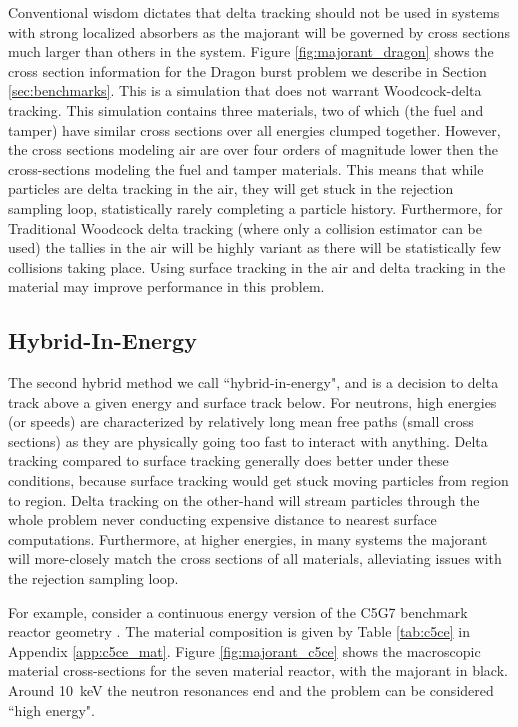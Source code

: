 Conventional wisdom dictates that delta tracking should not be used in systems with strong localized absorbers as the majorant will be governed by cross sections much larger than others in the system.
Figure \ref{fig:majorant_dragon} shows the cross section information for the Dragon burst problem we describe in Section \ref{sec:benchmarks}.
This is a simulation that does not warrant Woodcock-delta tracking.
This simulation contains three materials, two of which (the fuel and tamper) have similar cross sections over all energies clumped together.
However, the cross sections modeling air are over four orders of magnitude lower then the cross-sections modeling the fuel and tamper materials.
This means that while particles are delta tracking in the air, they will get stuck in the rejection sampling loop, statistically rarely completing a particle history.
Furthermore, for Traditional Woodcock delta tracking (where only a collision estimator can be used) the tallies in the air will be highly variant as there will be statistically few collisions taking place.
Using surface tracking in the air and delta tracking in the material may improve performance in this problem.

\subsection{Hybrid-In-Energy}
\label{sec:cutoff}

The second hybrid method we call ``hybrid-in-energy", and is a decision to delta track above a given energy and surface track below.
For neutrons, high energies (or speeds) are characterized by relatively long mean free paths (small cross sections) as they are physically going too fast to interact with anything.
Delta tracking compared to surface tracking generally does better under these conditions, because surface tracking would get stuck moving particles from region to region.
Delta tracking on the other-hand will stream particles through the whole problem never conducting expensive distance to nearest surface computations.
Furthermore, at higher energies, in many systems the majorant will more-closely match the cross sections of all materials, alleviating issues with the rejection sampling loop.

For example, consider a continuous energy version of the C5G7 benchmark reactor geometry \cite{jia_hou_oecdnea_2017}.
The material composition is given by Table \ref{tab:c5ce} in Appendix \ref{app:c5ce_mat}.
Figure \ref{fig:majorant_c5ce} shows the macroscopic material cross-sections for the seven material reactor, with the majorant in black.
Around \SI{10}{\kilo\electronvolt} the neutron resonances end and the problem can be considered ``high energy". 


